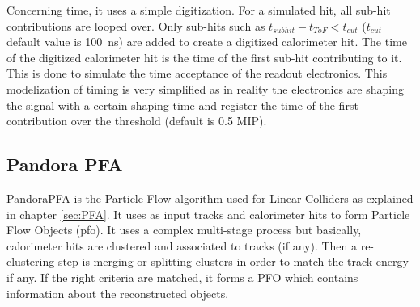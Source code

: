 Concerning time, it uses a simple digitization. For a simulated hit, all sub-hit contributions are looped over. Only sub-hits such as $t_{subhit} - t_{ToF} < t_{cut}$ ($t_{cut}$ default value is \SI{100}{\ns}) are added to create a digitized calorimeter hit. The time of the digitized calorimeter hit is the time of the first sub-hit contributing to it. This is done to simulate the time acceptance of the readout electronics. This modelization of timing is very simplified as in reality the electronics are shaping the signal with a certain shaping time and register the time of the first contribution over the threshold (default is 0.5 MIP).

\subsection{Pandora PFA}

PandoraPFA \cite{Thomson:2009rp} is the Particle Flow algorithm used for Linear Colliders as explained in chapter \ref{sec:PFA}. It uses as input tracks and calorimeter hits to form Particle Flow Objects (\acrshort{pfo}). It uses a complex multi-stage process but basically, calorimeter hits are clustered and associated to tracks (if any). Then a re-clustering step is merging or splitting clusters in order to match the track energy if any. If the right criteria are matched, it forms a PFO which contains information about the reconstructed objects.
